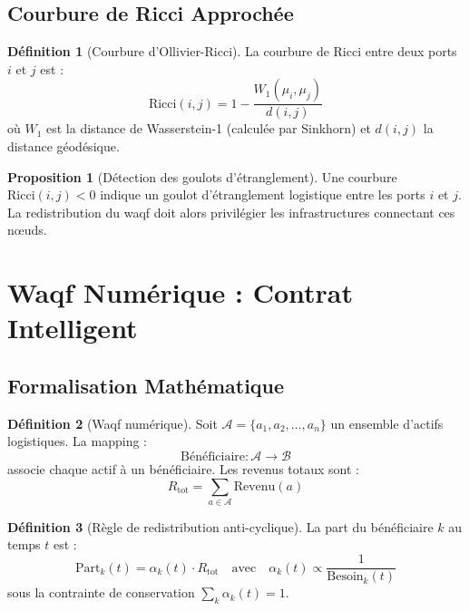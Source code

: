 \documentclass[11pt,a4paper]{article}
\theoremstyle{definition}
\newtheorem{definition}{Définition}[section]
\newtheorem{proposition}{Proposition}[section]
\theoremstyle{remark}
\begin{document}
\subsection{Courbure de Ricci Approchée}

\begin{definition}[Courbure d'Ollivier-Ricci]
\label{def:ricci}
La courbure de Ricci entre deux ports $i$ et $j$ est :
\begin{equation}
    \boxed{\text{Ricci}(i,j) = 1 - \frac{W_1(\mu_i, \mu_j)}{d(i,j)}}
\end{equation}
où $W_1$ est la distance de Wasserstein-1 (calculée par Sinkhorn) et $d(i,j)$ la distance géodésique.
\end{definition}

\begin{proposition}[Détection des goulots d'étranglement]
\label{prop:goulot}
Une courbure $\text{Ricci}(i,j) < 0$ indique un goulot d'étranglement logistique entre les ports $i$ et $j$. La redistribution du waqf doit alors privilégier les infrastructures connectant ces nœuds.
\end{proposition}

\section{Waqf Numérique : Contrat Intelligent}
\label{sec:waqf}

\subsection{Formalisation Mathématique}

\begin{definition}[Waqf numérique]
\label{def:waqf}
Soit $\mathcal{A} = \{a_1, a_2, \ldots, a_n\}$ un ensemble d'actifs logistiques. La mapping :
\begin{equation}
    \text{Bénéficiaire} : \mathcal{A} \to \mathcal{B}
\end{equation}
associe chaque actif à un bénéficiaire. Les revenus totaux sont :
\begin{equation}
    R_{\text{tot}} = \sum_{a \in \mathcal{A}} \text{Revenu}(a)
\end{equation}
\end{definition}

\begin{definition}[Règle de redistribution anti-cyclique]
\label{def:redistribution}
La part du bénéficiaire $k$ au temps $t$ est :
\begin{equation}
    \boxed{\text{Part}_k(t) = \alpha_k(t) \cdot R_{\text{tot}} \quad \text{avec} \quad \alpha_k(t) \propto \frac{1}{\text{Besoin}_k(t)}}
\end{equation}
sous la contrainte de conservation $\sum_k \alpha_k(t) = 1$.
\end{definition}
\end{document}
